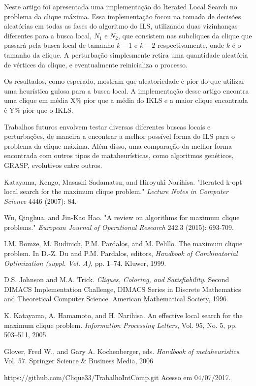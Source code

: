 \documentclass{article}
\begin{document}
Neste artigo foi apresentada uma implementação do Iterated Local Search no problema da clique máxima. Essa implementação focou na tomada de decisões aleatórias em todas as fases do algoritmo do ILS, utilizando duas vizinhanças diferentes para a busca local, $N_1$ e $N_2$, que consistem nas subcliques da clique que passará pela busca local de tamanho $k-1$ e $k-2$ respectivamente, onde $k$ é o tamanho da clique. A perturbação simplesmente retira uma quantidade aleatória de vértices da clique, e eventualmente reinicializa o processo.\par

Os resultados, como esperado, mostram que aleatoriedade é pior do que utilizar uma heurística gulosa para a busca local. A implementação desse artigo encontra uma clique em média X\% pior que a média do IKLS \cite{kopt} e a maior clique encontrada é Y\% pior que o IKLS. \par

Trabalhos futuros envolvem testar diversas diferentes buscas locais e perturbações, de maneira a encontrar a melhor possível forma do ILS para o problema da clique máxima. Além disso, uma comparação da melhor forma encontrada com outros tipos de mataheurísticas, como algoritmos genéticos, GRASP, evolutivos entre outros.

\begin{thebibliography}{58}

  Katayama, Kengo, Masashi Sadamatsu, and Hiroyuki Narihisa. 
"Iterated k-opt local search for the maximum clique problem." 
\textit{Lecture Notes in Computer Science} 4446 (2007): 84.

Wu, Qinghua, and Jin-Kao Hao. 
"A review on algorithms for maximum clique problems." 
\textit{European Journal of Operational Research} 242.3 (2015): 693-709.

I.M. Bomze, M. Budinich, P.M. Pardalos, and M. Pelillo. The maximum clique
problem. In D.-Z. Du and P.M. Pardalos, editors, \textit{Handbook of Combinatorial
Optimization (suppl. Vol. A)}, pp. 1–74. Kluwer, 1999.

D.S. Johnson and M.A. Trick. \textit{Cliques, Coloring, and Satisfiability}. Second DIMACS
Implementation Challenge, DIMACS Series in Discrete Mathematics and
Theoretical Computer Science. American Mathematical Society, 1996.

 K. Katayama, A. Hamamoto, and H. Narihisa. An effective local search for the
maximum clique problem. \textit{Information Processing Letters}, Vol. 95, No. 5, pp.
503–511, 2005.

Glover, Fred W., and Gary A. Kochenberger, eds. \textit{Handbook of metaheuristics}. Vol. 57. Springer Science \& Business Media, 2006

https://github.com/Clique33/TrabalhoIntComp.git Acesso em 04/07/2017.

\end{thebibliography}
\end{document}

